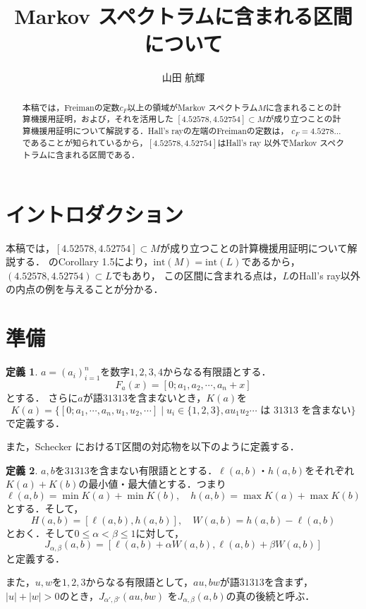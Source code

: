 \documentclass[10pt,a4paper]{ujarticle}
\author{山田 航輝}
\title{Markov スペクトラムに含まれる区間について}
\theoremstyle{definition}
\newtheorem{definition}{定義}
\begin{document}
\maketitle

\begin{abstract}
本稿では，Freimanの定数$c_F$以上の領域がMarkov スペクトラム$M$に含まれることの計算機援用証明，および，それを活用した
$[4.52578,4.52754]\subset M$が成り立つことの計算機援用証明について解説する．Hall's rayの左端のFreimanの定数は，
$c_F = 4.5278\dots$であることが知られているから，$[4.52578,4.52754]$はHall's ray 以外でMarkov スペクトラムに含まれる区間である．
\end{abstract}

\section{イントロダクション}
本稿では，$[4.52578,4.52754]\subset M$が成り立つことの計算機援用証明について解説する．
\cite{matheus-moreira}のCorollary 1.5により，$\mathrm{int} (M) =\mathrm{int} (L)$であるから，$(4.52578,4.52754) \subset L$でもあり，
この区間に含まれる点は，$L$のHall's ray以外の内点の例を与えることが分かる．
\section{準備}
\begin{definition}
    $a = (a_i)_{i = 1}^n$を数字$1,2,3,4$からなる有限語とする．
    \[
    F_a(x) = [0; a_1, a_2, \cdots, a_n + x]
    \]
    とする．
    さらに$a$が語$31313$を含まないとき，$K(a)$を
    \[
    K(a) = \{[0; a_1,\cdots, a_n, u_1, u_2,\cdots] \mid u_i \in \{1,2,3\}, a u_1u_2\cdots \text{ は } 31313 \text{ を含まない}\}
    \]
    で定義する．
\end{definition}
また，Schecker \cite{schecker}におけるT区間の対応物を以下のように定義する．
\begin{definition}
$a, b$を$31313$を含まない有限語ととする．$\ell(a, b)$・$h(a,b)$をそれぞれ$K(a) + K(b)$の最小値・最大値とする．つまり
\[
\ell(a, b) = \min K(a) + \min K(b), \quad h(a, b) = \max K(a) + \max K(b)
\]
とする．そして，
\[
H(a,b) = [\ell(a, b), h(a, b)], \quad W(a,b) = h(a, b) - \ell(a, b)
\]
とおく．そして$0 \le \alpha < \beta \le 1$に対して，
\[
J_{\alpha, \beta}(a, b) = [\ell(a, b) + \alpha W(a, b), \ell(a, b) + \beta W(a, b)]
\]
と定義する．

また，$u,w$を$1,2,3$からなる有限語として，$au, bw$が語$31313$を含まず，$|u| + |w| > 0$のとき，$J_{\alpha', \beta'}(au, bw)$
を$J_{\alpha, \beta}(a, b)$の真の後続と呼ぶ．
\end{definition}
\end{document}

